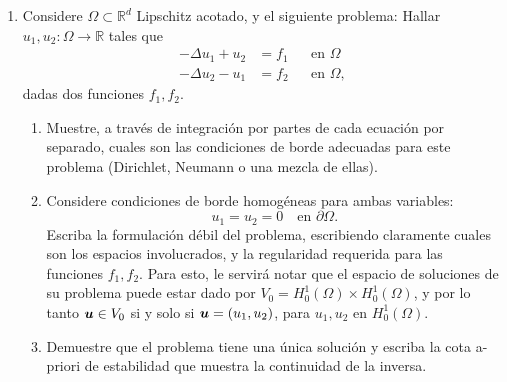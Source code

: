\documentclass{article}
\renewcommand{\vec}{\vectorsym}
\newcommand{\R}{\mathbb{R}}
\newcommand{\pts}[1]{[{\bf #1 puntos}] }
\begin{document}
\begin{enumerate}
        \item\pts{6} Considere $\Omega\subset \R^d$ Lipschitz acotado, y el siguiente problema: Hallar $u_1, u_2:\Omega \to \R$  tales que
            $$ 
            \begin{aligned}
                -\Delta u_1 + u_2 &= f_1  && \text{en $\Omega$} \\
                -\Delta u_2 - u_1 &= f_2  && \text{en $\Omega$},
            \end{aligned}
            $$
            dadas dos funciones $f_1,f_2$. 
            \begin{enumerate}
                \item\pts{2} Muestre, a través de integración por partes de cada ecuación por separado, cuales son las condiciones de borde adecuadas para este problema (Dirichlet, Neumann o una mezcla de ellas). 
                \item\pts{2} Considere condiciones de borde homogéneas para ambas variables: 
                        $$ u_1 = u_2 = 0 \quad\text{en $\partial\Omega$}. $$
                       Escriba la formulación débil del problema, escribiendo claramente cuales son los espacios involucrados, y la regularidad requerida para las funciones $f_1, f_2$. Para esto, le servirá notar que el espacio de soluciones de su problema puede estar dado por $V_0 = H_0^1(\Omega)\times H_0^1(\Omega)$, y por lo tanto $\vec u \in V_0$ si y solo si $\vec u = (u_1, u_2)$, para $u_1, u_2$ en $H_0^1(\Omega)$. 
                   \item\pts{2} Demuestre que el problema tiene una única solución y escriba la cota a-priori de estabilidad que muestra la continuidad de la inversa. 
            \end{enumerate}


\end{enumerate}
\end{document}
